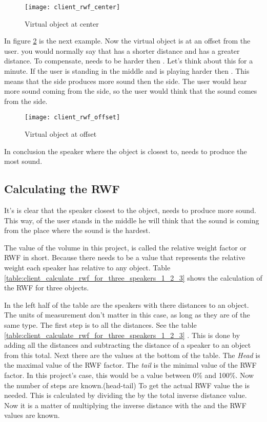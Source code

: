\begin{figure}[H]
    \centering
    \texttt{[image: client\_rwf\_center]}
    \caption{Virtual object at center}
    \label{fig:client_rwf_center}
\end{figure}

In figure \ref{fig:client_rwf_offset} is the next example. Now the virtual object is at an offset from the user.
you would normally say that  has a shorter distance and  has a greater distance.
To compensate,  needs to be harder then . Let's think about this for a minute.
If the user is standing in the middle and  is playing harder then .
This means that the  side produces more sound then the  side.
The user would hear more sound coming from the  side, so the user would think that the sound comes from the  side.

\begin{figure}[H]
    \centering
    \texttt{[image: client\_rwf\_offset]}
    \caption{Virtual object at offset}
    \label{fig:client_rwf_offset}
\end{figure}

In conclusion the speaker where the object is closest to, needs to produce the most sound.

\subsection{Calculating the RWF}
\label{sub:client_calculating_the_rwf}
It's is clear that the speaker closest to the object, needs to produce more sound.
This way, of the user stands in the middle he will think that the sound is coming from the place where the sound is the hardest.

The value of the volume in this project, is called the relative weight factor or RWF in short.
Because there needs to be a value that represents the relative weight each speaker has relative to any object.
Table \ref{table:client_calculate_rwf_for_three_speakers_1_2_3} shows the calculation of the RWF for three objects.


In the left half of the table are the speakers with there distances to an object.
The units of measurement don't matter in this case, as long as they are of the same type.
The first step is to  all the distances. See the table \ref{table:client_calculate_rwf_for_three_speakers_1_2_3} .
This is done by adding all the distances and subtracting the distance of a speaker to an object from this total.
Next there are the values at the bottom of the table. The \textit{Head} is the maximal value of the RWF factor.
The \textit{tail} is the minimal value of the RWF factor. In this project's case, this would be a value between 0\% and 100\%.
Now the number of steps are known.(head-tail)
To get the actual RWF value the  is needed. This is calculated by dividing the  by the total inverse distance value.
Now it is a matter of multiplying the inverse distance with the  and the RWF values are known.

